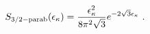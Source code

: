 \begin{equation} 
S_{\rm 3/2-parab}(\epsilon _{\kappa})= \frac{\epsilon _{\kappa}^{2}}{8\pi ^2 \sqrt{3}} 
e^{-2\sqrt{3}\epsilon _{\kappa}}~. 
\end{equation} 
